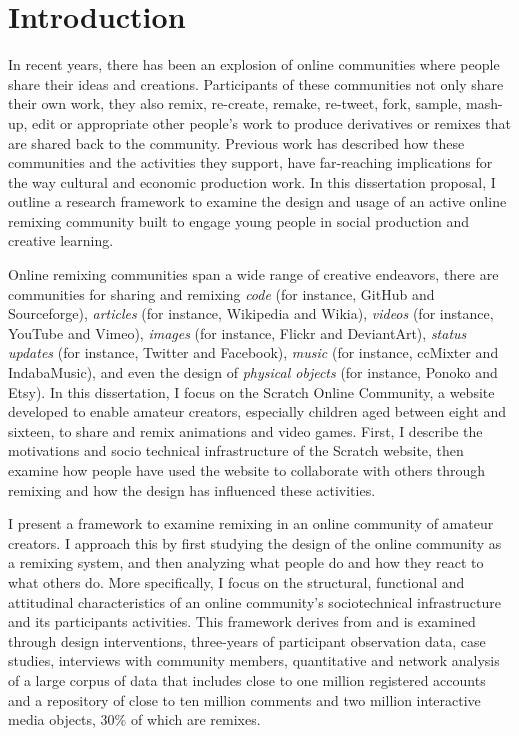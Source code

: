 \chapter{Introduction}

In recent years, there has been an explosion of online communities where people share their ideas and creations.
Participants of these communities not only share their own work, they also remix, re-create, remake, re-tweet, fork, sample, mash-up, edit or appropriate other people's work to produce derivatives or remixes that are shared back to the community.
Previous work has described how these communities and the activities they support, have far-reaching implications for the way cultural and economic production work.
In this dissertation proposal, I outline a research framework to examine the design and usage of an active online remixing community built to engage young people in social production and creative learning.

Online remixing communities span a wide range of creative endeavors, there are communities for sharing and remixing 
\emph{code} (for instance, GitHub and Sourceforge),
\emph{articles} (for instance, Wikipedia and Wikia), 
\emph{videos} (for instance, YouTube and Vimeo), 
\emph{images} (for instance, Flickr and DeviantArt), 
\emph{status updates} (for instance, Twitter and Facebook),
\emph{music} (for instance, ccMixter and IndabaMusic),
and even the design of \emph{physical objects} (for instance, Ponoko and Etsy).
In this dissertation, I focus on the Scratch Online Community, a website developed to enable amateur creators, especially children aged between eight and sixteen, to share and remix animations and video games.
First, I describe the motivations and socio technical infrastructure of the Scratch website, then examine how people have used the website to collaborate with others through remixing and how the design has influenced these activities.

I present a framework to examine remixing in an online community of amateur creators. 
I approach this by first studying the design of the online community as a remixing system, and then analyzing what people do and how they react to what others do.
More specifically, I focus on the structural, functional and attitudinal characteristics of an online community's sociotechnical infrastructure and its participants activities.
This framework derives from and is examined through design interventions, three-years of participant observation data, case studies, interviews with community members, quantitative and network analysis of a large corpus of data that includes close to one million registered accounts and a repository of close to ten million comments and two million interactive media objects, 30\% of which are remixes.

